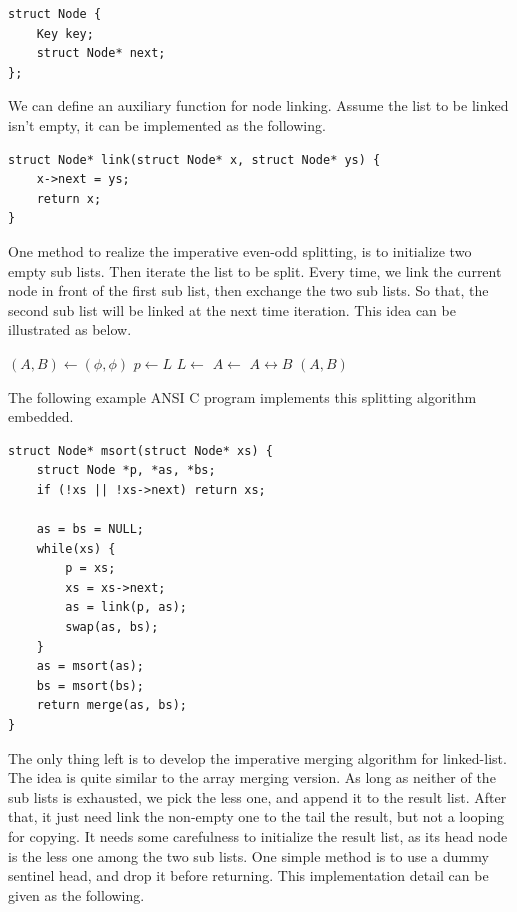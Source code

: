 \documentclass[b5paper]{article}
\begin{document}
\lstset{language=C}
\begin{lstlisting}
struct Node {
    Key key;
    struct Node* next;
};
\end{lstlisting}

We can define an auxiliary function for node linking. Assume the list to be linked isn't empty, it
can be implemented as the following.

\lstset{language=C}
\begin{lstlisting}
struct Node* link(struct Node* x, struct Node* ys) {
    x->next = ys;
    return x;
}
\end{lstlisting}

One method to realize the imperative even-odd splitting, is to initialize two empty sub lists.
Then iterate the list to be split. Every time, we link the current node in front of the
first sub list, then exchange the two sub lists. So that, the second sub list will be linked
at the next time iteration. This idea can be illustrated as below.

\begin{algorithmic}[1]
  \State $(A, B) \gets (\phi, \phi)$
    \State $p \gets L$
    \State $L \gets $ 
    \State $A \gets $ 
    \State {} $A \leftrightarrow B$
  \EndWhile
  \State \Return $(A, B)$
\EndFunction
\end{algorithmic}

The following example ANSI C program implements this splitting algorithm embedded.

\lstset{language=C}
\begin{lstlisting}
struct Node* msort(struct Node* xs) {
    struct Node *p, *as, *bs;
    if (!xs || !xs->next) return xs;

    as = bs = NULL;
    while(xs) {
        p = xs;
        xs = xs->next;
        as = link(p, as);
        swap(as, bs);
    }
    as = msort(as);
    bs = msort(bs);
    return merge(as, bs);
}
\end{lstlisting}

The only thing left is to develop the imperative merging algorithm for linked-list. The idea
is quite similar to the array merging version. As long as neither of the sub lists is exhausted,
we pick the less one, and append it to the result list. After that, it just need link the
non-empty one to the tail the result, but not a looping for copying. It needs some carefulness
to initialize the result list, as its head node is the less one among the two sub lists.
One simple method is to use a dummy sentinel head, and drop it before returning. This implementation
detail can be given as the following.
\end{document}
